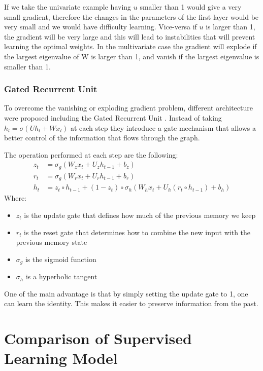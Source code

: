 \documentclass[10pt,oneside,openright]{report}
\begin{document}
 If we take the univariate example having $u$ smaller than 1 would give a very small gradient, therefore the changes in the parameters of the first layer would be very small and we would have difficulty learning. Vice-versa if $u$ is larger than 1, the gradient will be very large and this will lead to instabilities that will prevent learning the optimal weights. In the multivariate case the gradient will explode if the largest eigenvalue of W is larger than 1, and vanish if the largest eigenvalue is smaller than 1.

\subsection{Gated Recurrent Unit}
To overcome the vanishing or exploding gradient problem, different architecture were proposed including the Gated Recurrent Unit \cite{gru}. Instead of taking $h_l = \sigma(U h_l + W x_l)$ at each step they introduce a gate mechanism that allows a better control of the information that flows through the graph.

The operation performed at each step are the following:
\begin{align}
z_t &= \sigma_g(W_{z} x_t + U_{z} h_{t-1} + b_z) \\
r_t &= \sigma_g(W_{r} x_t + U_{r} h_{t-1} + b_r) \\
h_t &=  z_t \circ h_{t-1} + (1-z_t) \circ \sigma_h(W_{h} x_t + U_{h} (r_t \circ h_{t-1}) + b_h)
\end{align}
Where:
\begin{itemize}
 \item $z_t$ is the update gate that defines how much of the previous memory we keep
 \item $r_t$ is the reset gate that determines how to combine the new input with the previous memory state
\item  $\sigma_g$ is the sigmoid function
\item $\sigma_h$ is a hyperbolic tangent
\end{itemize}

One of the main advantage is that by simply setting the update gate to 1, one can learn the identity. This makes it easier to preserve information from the past.

\chapter{Comparison of Supervised Learning Model}
\end{document}
